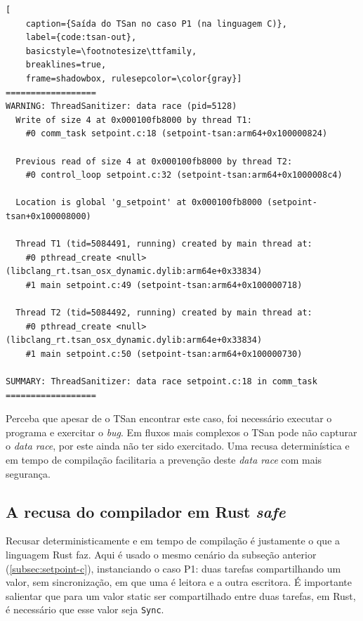\begin{lstlisting}[
    caption={Saída do TSan no caso P1 (na linguagem C)},
    label={code:tsan-out},
    basicstyle=\footnotesize\ttfamily,
    breaklines=true,
    frame=shadowbox, rulesepcolor=\color{gray}]
==================
WARNING: ThreadSanitizer: data race (pid=5128)
  Write of size 4 at 0x000100fb8000 by thread T1:
    #0 comm_task setpoint.c:18 (setpoint-tsan:arm64+0x100000824)

  Previous read of size 4 at 0x000100fb8000 by thread T2:
    #0 control_loop setpoint.c:32 (setpoint-tsan:arm64+0x1000008c4)

  Location is global 'g_setpoint' at 0x000100fb8000 (setpoint-tsan+0x100008000)

  Thread T1 (tid=5084491, running) created by main thread at:
    #0 pthread_create <null> (libclang_rt.tsan_osx_dynamic.dylib:arm64e+0x33834)
    #1 main setpoint.c:49 (setpoint-tsan:arm64+0x100000718)

  Thread T2 (tid=5084492, running) created by main thread at:
    #0 pthread_create <null> (libclang_rt.tsan_osx_dynamic.dylib:arm64e+0x33834)
    #1 main setpoint.c:50 (setpoint-tsan:arm64+0x100000730)

SUMMARY: ThreadSanitizer: data race setpoint.c:18 in comm_task
==================
\end{lstlisting}

Perceba que apesar de o \ac{TSan} encontrar este caso, foi necessário executar o programa e exercitar o \textit{bug}. Em fluxos mais complexos o \ac{TSan} pode não capturar o \textit{data race}, por este ainda não ter sido exercitado. Uma recusa determinística e em tempo de compilação facilitaria a prevenção deste \textit{data race} com mais segurança.

\subsection{A recusa do compilador em Rust \textit{safe}}
\label{subsec:setpoint-reject}

Recusar deterministicamente e em tempo de compilação é justamente o que a linguagem Rust faz. Aqui é usado o mesmo cenário da subseção anterior (\ref{subsec:setpoint-c}), instanciando o caso P1: duas tarefas compartilhando um valor, sem sincronização, em que uma é leitora e a outra escritora. É importante salientar que para um valor static ser compartilhado entre duas tarefas, em Rust, é necessário que esse valor seja \texttt{Sync}.


